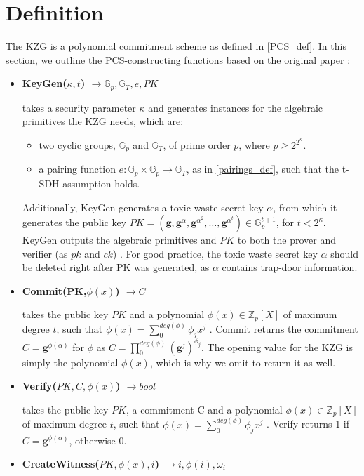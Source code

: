 \section*{Definition}
\label{Def}
The KZG is a polynomial commitment scheme as defined in \ref{PCS_def}. In this section, we outline the PCS-constructing functions based on the original paper \parencite{KZG}:
\begin{itemize}
    \item \textbf{KeyGen($\kappa,t$) $\rightarrow \mathbb{G}_p, \mathbb{G}_T, e, PK$} 
    
    takes a security parameter $\kappa$ and generates instances for the algebraic primitives the KZG needs, which are: 
    \begin{itemize}
        \item two cyclic groups, $\mathbb{G}_p$ and $\mathbb{G}_T$, of prime order $p$, where $p\ge2^{2^\kappa}$.
        \item a pairing function $e: \mathbb{G}_p \times \mathbb{G}_p \rightarrow \mathbb{G}_T$, as in \ref{pairings_def}, such that the t-SDH assumption holds.
    \end{itemize}
    \parencite{KZG}
    Additionally, KeyGen generates a toxic-waste secret key $\alpha$, from which it generates the public key $PK=(\mathbf{g}, \mathbf{g}^\alpha, \mathbf{g}^{\alpha^2},\dots,\mathbf{g}^{\alpha^t})\in \mathbb{G}_p^{t+1}$, for $t<2^\kappa$. KeyGen outputs the algebraic primitives and $PK$ to both the prover and verifier (as $pk$ and $ck$) \parencite{KZG}. 
    For good practice, the toxic waste secret key $\alpha$ should be deleted right after PK was generated, as $\alpha$ contains trap-door information. 
    \item \textbf{Commit(PK,$\phi(x)$) $\rightarrow C$}

    takes the public key $PK$ and a polynomial $\phi(x) \in \mathbb{Z}_p[X]$
    of maximum degree $t$, such that $\phi(x)=\sum_{0}^{deg(\phi)}\phi_jx^j$
    \parencite{KZG}. Commit returns the commitment $C=\mathbf{g}^{\phi(\alpha)}$ for $\phi$ as $C=\prod_{0}^{deg(\phi)}(\mathbf{g}^j)^{\phi_j}$\parencite{KZG}.
    The opening value for the KZG is simply the polynomial $\phi(x)$, which is why we omit to return it as well.

    \item \textbf{Verify($PK,C,\phi(x)$) $\rightarrow bool$}

    takes the public key $PK$, a commitment C and a polynomial $\phi(x) \in \mathbb{Z}_p[X]$ of maximum degree $t$, such that $\phi(x)=\sum_{0}^{deg(\phi)}\phi_jx^j$ \parencite{KZG}. Verify returns 1 if $C=\mathbf{g}^{\phi(\alpha)}$, otherwise 0.
    \item \textbf{CreateWitness($PK, \phi(x), i$) $\rightarrow i,\phi(i),\omega_i$ }


\end{itemize}

